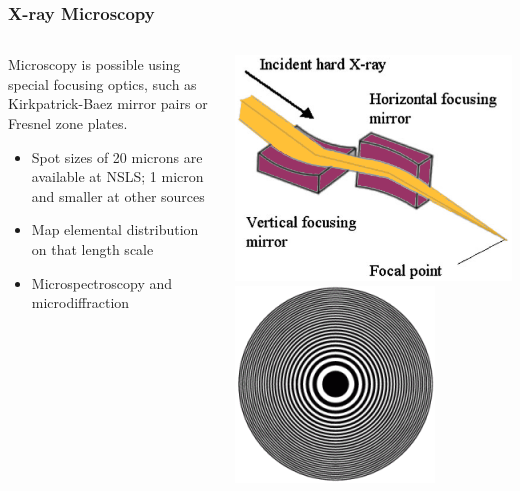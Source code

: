 \documentclass[10pt, xcolor=x11names, compress]{beamer}
\begin{document}
\begin{frame}
  \frametitle{X-ray Microscopy}
  
  \begin{columns}
    \begin{column}{0.5\linewidth}
      Microscopy is possible using special focusing optics, such as
      {\color{Blue3}Kirkpatrick-Baez mirror pairs} or
      {\color{Blue3}Fresnel zone plates}.

      \medskip

      \begin{itemize}
      \item Spot sizes of 20 microns are available at NSLS; 1 micron
        and smaller at other sources
      \item Map elemental distribution on that length scale
      \item Microspectroscopy and microdiffraction
      \end{itemize}
    \end{column}
    \begin{column}{0.5\linewidth}
      \begin{center}
        \includegraphics[width=0.9\linewidth]{xrf/kb.png}\\[2ex]
        \includegraphics[width=0.6\linewidth]{xrf/zp.png}
      \end{center}
    \end{column}
  \end{columns}
\end{frame}
\end{document}
